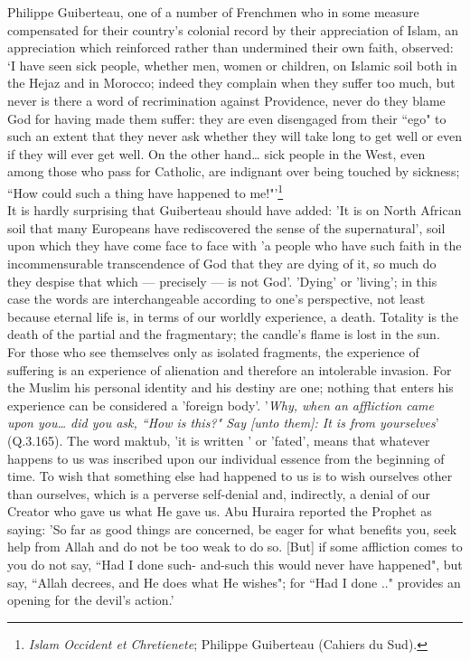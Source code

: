 \documentclass[10pt, twoside]{book}
\begin{document}
Philippe Guiberteau, one of a number of Frenchmen who in some measure compensated for their country's 
colonial record by their appreciation of Islam, an appreciation which reinforced rather than 
undermined their own faith, observed: `I have seen sick people, whether men, women or children, on 
Islamic soil both in the Hejaz and in Morocco; indeed they complain when they suffer too much, but 
never is there a word of recrimination against Providence, never do they blame God for having made 
them suffer: they are even disengaged from their ``ego" to such an extent that they never ask whether 
they will take long to get well or even if they will ever get well. On the other hand\ldots{} sick people 
in the West, even among those who pass for Catholic, are indignant over being touched by sickness; 
``How could such a thing have happened to me!"'\footnote{\emph{Islam Occident et Chretienete}; Philippe Guiberteau (Cahiers du Sud).}\\ 

It is hardly surprising that Guiberteau should have added: 'It is on North African soil that many 
Europeans have rediscovered the sense of the supernatural', soil upon which they have come face to 
face with 'a people who have such faith in the incommensurable transcendence of God that they are 
dying of it, so much do they despise that which --- precisely --- is not God'. 'Dying' or 'living'; in 
this case the words are interchangeable according to one's perspective, not least because eternal 
life is, in terms of our worldly experience, a death. Totality is the death of the partial and the 
fragmentary; the candle's flame is lost in the sun. \\

For those who see themselves only as isolated fragments, the experience of suffering is an experience 
of alienation and therefore an intolerable invasion. For the Muslim his personal identity and his 
destiny are one; nothing that enters his experience can be considered a 'foreign body'. '\emph{Why, when an 
affliction came upon you\ldots{} did you ask, ``How is this?" Say [unto them]: It is from 
yourselves}' (Q.3.165). The word maktub, 'it is written ' or 'fated', means that whatever happens to us 
was inscribed upon our individual essence from the beginning of time. To wish that something else had 
happened to us is to wish ourselves other than ourselves, which is a perverse self\hyp{}denial and, 
indirectly, a denial of our Creator who gave us what He gave us. Abu Huraira reported the Prophet as 
saying: 'So far as good things are concerned, be eager for what benefits you, seek help from Allah 
and do not be too weak to do so. [But] if some affliction comes to you do not say, ``Had I done such\hyp{}
and\hyp{}such this would never have happened", but say, ``Allah decrees, and He does what He wishes"; for 
``Had I done .." provides an opening for the devil's action.' \\
\end{document}
